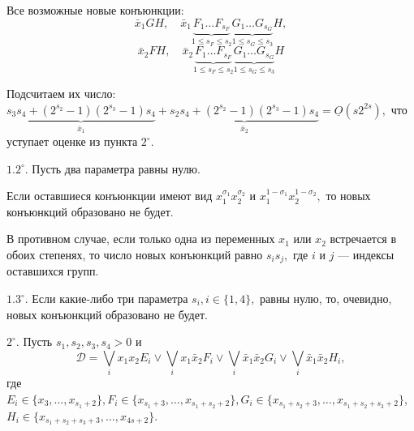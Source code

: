 \documentclass[12pt,a4paper,oneside,fleqn,leqno]{article}
\theoremstyle{definition}
\begin{document}
			Все возможные новые конъюнкции:
			$$
				\bar{x}_1GH, \quad \bar{x}_1\underbrace{F_1\ldots F_{s_F}}_{1 \leqslant s_F \leqslant s_2}\underbrace{G_1\ldots G_{s_G}}_{1 \leqslant s_G \leqslant s_3}H,$$
			$$
				 \bar{x}_2FH, \quad\bar{x}_2\underbrace{F_1\ldots F_{s_F}}_{1 \leqslant s_F \leqslant s_2}\underbrace{G_1\ldots G_{s_G}}_{1 \leqslant s_G \leqslant s_3}H
			$$\par
			Подсчитаем их число: $\underbrace{s_3s_4 + (2^{s_2} - 1)(2^{s_3} - 1)s_4}_{\bar{x}_1} + \underbrace{s_2s_4 + (2^{s_2} - 1)(2^{s_3} - 1)s_4}_{\bar{x}_2} = \underline{O}(s2^{2s}),$ что уступает оценке из пункта $2^{\circ}.$\par
			$1.2^{\circ}.$ Пусть два параметра равны нулю.\par
			Если оставшиеся конъюнкции имеют вид $x_1^{\sigma_1}x_2^{\sigma_2}$ и $x_1^{1 - \sigma_1}x_2^{1 - \sigma_2},$ то новых конъюнкций образовано не будет.\par
			В противном случае, если только одна из переменных $x_1$ или $x_2$ встречается в обоих степенях, то число новых конъюнкций равно $s_is_j,$ где $i$ и $j$ --- индексы оставшихся групп.\par
			$1.3^{\circ}.$ Если какие-либо три параметра $s_i, i\in\{1,4\},$ равны нулю, то, очевидно, новых конъюнкций образовано не будет.\par
			$2^{\circ}.$ Пусть $s_1, s_2, s_3, s_4 > 0$ и
			$$\mathcal{D} =\bigvee_ix_1x_2E_i \vee \bigvee_ix_1\bar{x}_2F_i \vee \bigvee_i\bar{x}_1\bar{x}_2G_i \vee \bigvee_i\bar{x}_1\bar{x}_2H_i,$$
			где $E_i \in \{x_3,\ldots,x_{s_1 + 2} \}, F_i \in \{x_{s_1 + 3}, \ldots, x_{s_1 + s_2 + 2}\}, G_i \in \{x_{s_1 + s_2 + 3}, \ldots, x_{s_1 + s_2 + s_3 + 2}\}$,\\$H_i \in \{x_{s_1 + s_2  + s_3 + 3}, \ldots, x_{4s + 2}\}.$\par
			
\end{document}

